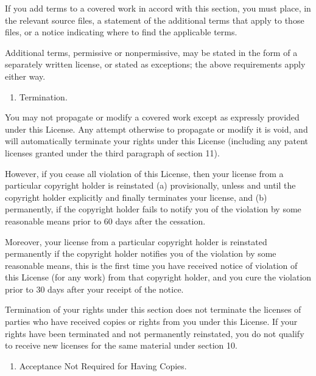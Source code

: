 \documentclass[letterpaper,10pt,english]{sphinxmanual}
\begin{document}
\sphinxAtStartPar
If you add terms to a covered work in accord with this section, you must place, in the relevant source files, a statement of the additional terms that apply to those files, or a notice indicating where to find the applicable terms.

\sphinxAtStartPar
Additional terms, permissive or non\sphinxhyphen{}permissive, may be stated in the form of a separately written license, or stated as exceptions; the above requirements apply either way.
\begin{enumerate}
%
\setcounter{enumi}{7}
\item {} 
\sphinxAtStartPar
Termination.

\end{enumerate}

\sphinxAtStartPar
You may not propagate or modify a covered work except as expressly provided under this License. Any attempt otherwise to propagate or modify it is void, and will automatically terminate your rights under this License (including any patent licenses granted under the third paragraph of section 11).

\sphinxAtStartPar
However, if you cease all violation of this License, then your license from a particular copyright holder is reinstated (a) provisionally, unless and until the copyright holder explicitly and finally terminates your license, and (b) permanently, if the copyright holder fails to notify you of the violation by some reasonable means prior to 60 days after the cessation.

\sphinxAtStartPar
Moreover, your license from a particular copyright holder is reinstated permanently if the copyright holder notifies you of the violation by some reasonable means, this is the first time you have received notice of violation of this License (for any work) from that copyright holder, and you cure the violation prior to 30 days after your receipt of the notice.

\sphinxAtStartPar
Termination of your rights under this section does not terminate the licenses of parties who have received copies or rights from you under this License. If your rights have been terminated and not permanently reinstated, you do not qualify to receive new licenses for the same material under section 10.
\begin{enumerate}
%
\setcounter{enumi}{8}
\item {} 
\sphinxAtStartPar
Acceptance Not Required for Having Copies.

\end{enumerate}
\end{document}
